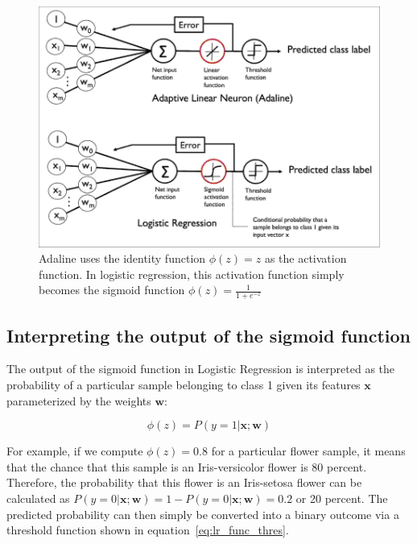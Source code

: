 \documentclass[11pt]{article}
\newcommand{\vect}[1]{\boldsymbol{#1}}
\begin{document}
    \begin{figure}[hbt!]
        \centering
        \includegraphics[width=1\linewidth,trim=1 1 1 1,clip]{img/lr_vs_adaline.jpg}
        \caption{Adaline uses the identity function $\phi(z) = z$ as the activation function.
        In logistic regression, this activation function simply becomes the sigmoid function $\phi(z) = \frac{1} {1 + e^{-z}}$ }
        \label{fig:lr_ada}
    \end{figure}

    \subsection{Interpreting the output of the sigmoid function} \label{subsec:lr_sig_interp}

    The output of the sigmoid function in Logistic Regression is interpreted as the probability of a particular sample belonging to class 1 given its features $\vect{x}$ parameterized by the weights $\vect{w}$:

    \begin{equation}
        \label{eq:lr_interp}
        \phi(z) = P( y = 1 | \vect{x}; \vect{w})
    \end{equation}

    For example, if we compute $\phi(z) = 0.8$ for a particular flower sample, it means that the chance that this sample is an Iris-versicolor flower is 80 percent.
    Therefore, the probability that this flower is an Iris-setosa flower can be calculated as $ P( y = 0 | \vect{x}; \vect{w}) = 1 - P( y = 0 | \vect{x}; \vect{w}) = 0.2 $ or 20 percent.
    The predicted probability can then simply be converted into a binary outcome via a threshold function shown in equation~\ref{eq:lr_func_thres}.
\end{document}
